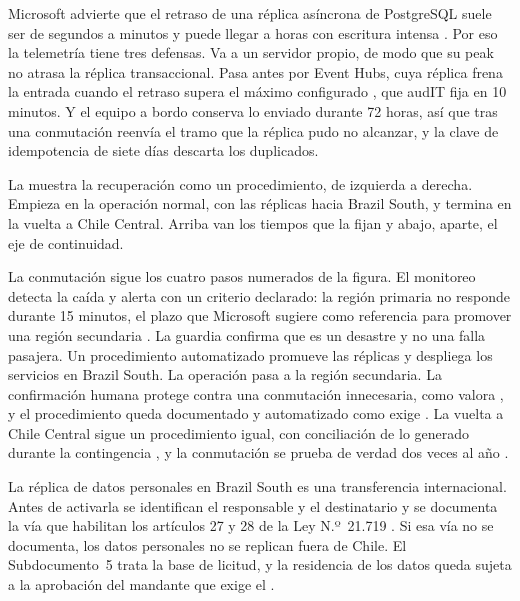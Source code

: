Microsoft advierte que el retraso de una réplica asíncrona de PostgreSQL suele ser de segundos a minutos
y puede llegar a horas con escritura intensa \parencite{ms_pg_replicas}. Por eso la telemetría tiene tres
defensas. Va a un servidor propio, de modo que su peak no atrasa la réplica transaccional. Pasa antes por
Event Hubs, cuya réplica frena la entrada cuando el retraso supera el máximo configurado
\parencite{ms_eh_georep}, que audIT fija en 10 minutos. Y el equipo a bordo conserva lo enviado durante
72 horas, así que tras una conmutación reenvía el tramo que la réplica pudo no alcanzar, y la clave de
idempotencia de siete días descarta los duplicados.

La  muestra la recuperación como un procedimiento, de izquierda a derecha. Empieza en la
operación normal, con las réplicas hacia Brazil South, y termina en la vuelta a Chile Central. Arriba
van los tiempos que la fijan y abajo, aparte, el eje de continuidad.


La conmutación sigue los cuatro pasos numerados de la figura. El monitoreo detecta la caída y
alerta con un criterio declarado: la región primaria no responde durante 15 minutos, el plazo que
Microsoft sugiere como referencia para promover una región secundaria \parencite{ms_eh_georep}. La guardia
confirma que es un desastre y no una falla pasajera. Un procedimiento automatizado promueve las
réplicas y despliega los servicios en Brazil South. La operación pasa a la región secundaria. La
confirmación humana protege contra una conmutación innecesaria, como valora , y el
procedimiento queda documentado y automatizado como exige . La vuelta a Chile
Central sigue un procedimiento igual, con conciliación de lo generado durante la contingencia
, y la conmutación se prueba de verdad dos veces al año
.

La réplica de datos personales en Brazil South es una transferencia internacional. Antes de activarla
se identifican el responsable y el destinatario y se documenta la vía que habilitan los artículos 27 y
28 de la Ley N.º~21.719 \parencite{ley21719}. Si esa vía no se documenta, los datos personales no se
replican fuera de Chile. El Subdocumento~5 trata la base de licitud, y la residencia de los datos queda
sujeta a la aprobación del mandante que exige el .

